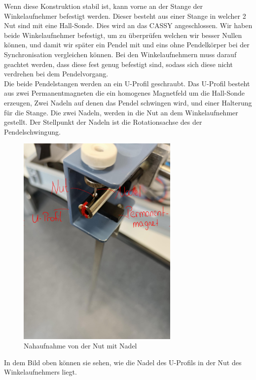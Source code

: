 \documentclass[twoside]{protokoll}
\begin{document}
Wenn diese Konstruktion stabil ist, kann vorne an der Stange der Winkelaufnehmer befestigt werden. 
Dieser besteht aus einer Stange in welcher 2 Nut sind mit eine Hall-Sonde. 
Dies wird an das CASSY angeschlossen.
Wir haben beide Winkelaufnehmer befestigt, um zu überprüfen welchen wir besser Nullen können, und damit wir später ein Pendel mit und eins ohne Pendelkörper bei der Synchronisation vergleichen können.
Bei den Winkelaufnehmern muss darauf geachtet werden, dass diese fest genug befestigt sind, sodass sich diese nicht verdrehen bei dem Pendelvorgang.\\

Die beide Pendelstangen werden an ein U-Profil geschraubt.
Das U-Profil besteht aus zwei Permanentmagneten die ein homogenes Magnetfeld um die Hall-Sonde erzeugen, Zwei Nadeln auf denen das Pendel schwingen wird, und einer Halterung für die Stange. 
Die zwei Nadeln, werden in die Nut an dem Winkelaufnehmer gestellt.
Der Stellpunkt der Nadeln ist die Rotationsachse des der Pendelschwingung. \\

\begin{figure}[H]
    \centering
    \includegraphics[width=0.7\textwidth]{Bilder/Nahaufnahme-Nut_B.pdf}
    \caption{Nahaufnahme von der Nut mit Nadel}
\end{figure}
In dem Bild oben können sie sehen, wie die Nadel des U-Profils in der Nut des Winkelaufnehmers liegt.
\end{document}
